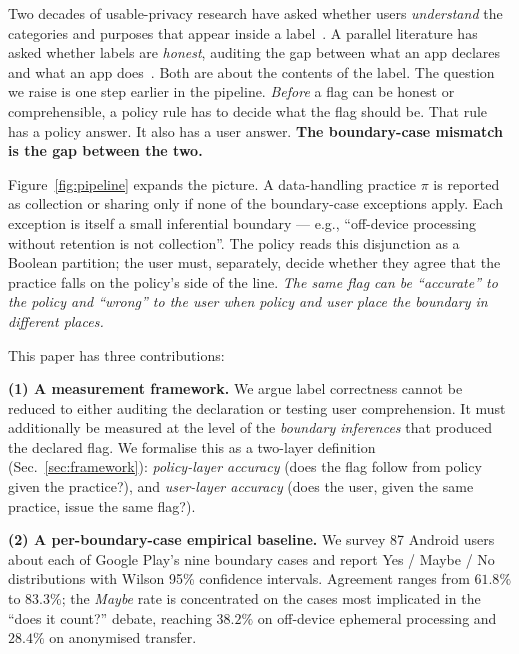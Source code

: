 \documentclass[11pt,a4paper]{article}
\begin{document}
Two decades of usable-privacy research have asked whether users
\emph{understand} the categories and purposes that appear inside a
label~\citep{kelley:etal:2009,kelley:etal:2010,kelley:etal:2013,
zhang:etal:2022,reidenberg:etal:2015}. A parallel literature has
asked whether labels are \emph{honest}, auditing the gap between what
an app declares and what an app does~\citep{koch:etal:2022,
kollnig:etal:2022,bhagavatula:etal:2023,khandelwal:etal:2023,
andow:etal:2020}. Both are about the contents of the label. The
question we raise is one step earlier in the pipeline. \emph{Before}
a flag can be honest or comprehensible, a policy rule has to decide
what the flag should be. That rule has a policy answer. It also has a
user answer. \textbf{The boundary-case mismatch is the gap between
the two.}



Figure~\ref{fig:pipeline} expands the picture. A data-handling
practice $\pi$ is reported as collection or sharing only if none of
the boundary-case exceptions apply. Each exception is itself a small
inferential boundary --- e.g., ``off-device processing without
retention is not collection''. The policy reads this disjunction as a
Boolean partition; the user must, separately, decide whether they
agree that the practice falls on the policy's side of the line.
\emph{The same flag can be ``accurate'' to the policy and ``wrong''
to the user when policy and user place the boundary in different
places.}

This paper has three contributions:

\textbf{(1) A measurement framework.} We argue label correctness
cannot be reduced to either auditing the declaration or testing user
comprehension. It must additionally be measured at the level of the
\emph{boundary inferences} that produced the declared flag. We
formalise this as a two-layer definition (Sec.~\ref{sec:framework}):
\emph{policy-layer accuracy} (does the flag follow from policy given
the practice?), and \emph{user-layer accuracy} (does the user, given
the same practice, issue the same flag?).

\textbf{(2) A per-boundary-case empirical baseline.}
We survey 87 Android users about each of Google Play's nine boundary
cases and report Yes / Maybe / No distributions with Wilson 95\%
confidence intervals. Agreement ranges from $61.8\%$ to $83.3\%$;
the \emph{Maybe} rate is concentrated on the cases most implicated
in the ``does it count?'' debate, reaching $38.2\%$ on off-device
ephemeral processing and $28.4\%$ on anonymised transfer.
\end{document}
